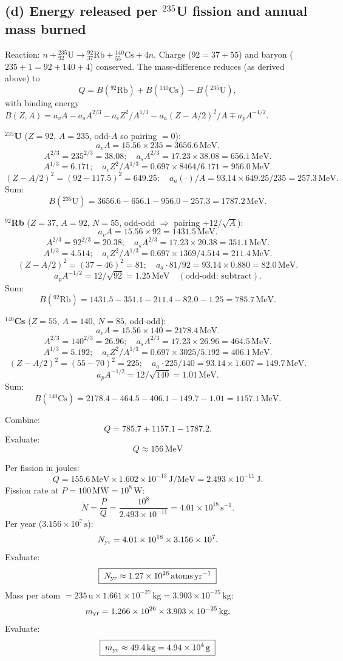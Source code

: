 \documentclass[11pt]{article}
\newcommand{\MeV}{\,\mathrm{MeV}}
\begin{document}
\subsection*{(d) Energy released per $^{235}$U fission and annual mass burned}

Reaction: $n + {}^{235}_{92}\!\text{U} \to {}^{92}_{37}\!\text{Rb} + {}^{140}_{55}\!\text{Cs} + 4n$. Charge ($92=37+55$) and baryon ($235+1=92+140+4$) conserved. The mass-difference reduces (as derived above) to
\[
Q = B(^{92}\!\text{Rb}) + B(^{140}\!\text{Cs}) - B(^{235}\!\text{U}),
\]
with binding energy $B(Z,A) = a_v A - a_s A^{2/3} - a_c Z^2/A^{1/3} - a_a(Z-A/2)^2/A \mp a_p A^{-1/2}$.

\textbf{$^{235}$U} ($Z=92$, $A=235$, odd-$A$ so pairing $=0$):
\[
a_v A = 15.56 \times 235 = 3656.6\MeV.
\]
\[
A^{2/3} = 235^{2/3} = 38.08;\quad a_s A^{2/3} = 17.23\times 38.08 = 656.1\MeV.
\]
\[
A^{1/3} = 6.171;\quad a_c Z^2/A^{1/3} = 0.697\times 8464/6.171 = 956.0\MeV.
\]
\[
(Z-A/2)^2 = (92-117.5)^2 = 649.25;\quad a_a(\cdot)/A = 93.14\times 649.25/235 = 257.3\MeV.
\]
Sum:
\[
B(^{235}\!\text{U}) = 3656.6 - 656.1 - 956.0 - 257.3 = 1787.2\MeV.
\]

\textbf{$^{92}$Rb} ($Z=37$, $A=92$, $N=55$, odd-odd $\Rightarrow$ pairing $+12/\sqrt{A}$):
\[
a_v A = 15.56\times 92 = 1431.5\MeV.
\]
\[
A^{2/3} = 92^{2/3} = 20.38;\quad a_s A^{2/3} = 17.23\times 20.38 = 351.1\MeV.
\]
\[
A^{1/3} = 4.514;\quad a_c Z^2/A^{1/3} = 0.697\times 1369/4.514 = 211.4\MeV.
\]
\[
(Z-A/2)^2 = (37-46)^2 = 81;\quad a_a\cdot 81/92 = 93.14\times 0.880 = 82.0\MeV.
\]
\[
a_p A^{-1/2} = 12/\sqrt{92} = 1.25\MeV \quad (\text{odd-odd: subtract}).
\]
Sum:
\[
B(^{92}\!\text{Rb}) = 1431.5 - 351.1 - 211.4 - 82.0 - 1.25 = 785.7\MeV.
\]

\textbf{$^{140}$Cs} ($Z=55$, $A=140$, $N=85$, odd-odd):
\[
a_v A = 15.56\times 140 = 2178.4\MeV.
\]
\[
A^{2/3} = 140^{2/3} = 26.96;\quad a_s A^{2/3} = 17.23\times 26.96 = 464.5\MeV.
\]
\[
A^{1/3} = 5.192;\quad a_c Z^2/A^{1/3} = 0.697\times 3025/5.192 = 406.1\MeV.
\]
\[
(Z-A/2)^2 = (55-70)^2 = 225;\quad a_a\cdot 225/140 = 93.14\times 1.607 = 149.7\MeV.
\]
\[
a_p A^{-1/2} = 12/\sqrt{140} = 1.01\MeV.
\]
Sum:
\[
B(^{140}\!\text{Cs}) = 2178.4 - 464.5 - 406.1 - 149.7 - 1.01 = 1157.1\MeV.
\]

Combine:
\[
Q = 785.7 + 1157.1 - 1787.2.
\]
Evaluate:
\[
\boxed{\;Q \approx 156\MeV\;}
\]

Per fission in joules:
\[
Q = 155.6\MeV \times 1.602\times 10^{-13}\,\text{J/MeV} = 2.493\times 10^{-11}\,\text{J}.
\]
Fission rate at $P=100\,\text{MW}=10^8\,\text{W}$:
\[
\dot N = \frac{P}{Q} = \frac{10^{8}}{2.493\times 10^{-11}} = 4.01\times 10^{18}\,\text{s}^{-1}.
\]
Per year ($3.156\times 10^7\,\text{s}$):
\[
N_{\rm yr} = 4.01\times 10^{18}\times 3.156\times 10^7.
\]
Evaluate:
\[
\boxed{\;N_{\rm yr} \approx 1.27\times 10^{26}\,\text{atoms\,yr}^{-1}\;}
\]
Mass per atom $= 235\,\text{u} \times 1.661\times 10^{-27}\,\text{kg} = 3.903\times 10^{-25}\,\text{kg}$:
\[
m_{\rm yr} = 1.266\times 10^{26}\times 3.903\times 10^{-25}\,\text{kg}.
\]
Evaluate:
\[
\boxed{\;m_{\rm yr} \approx 49.4\,\text{kg} = 4.94\times 10^4\,\text{g}\;}
\]
\end{document}
